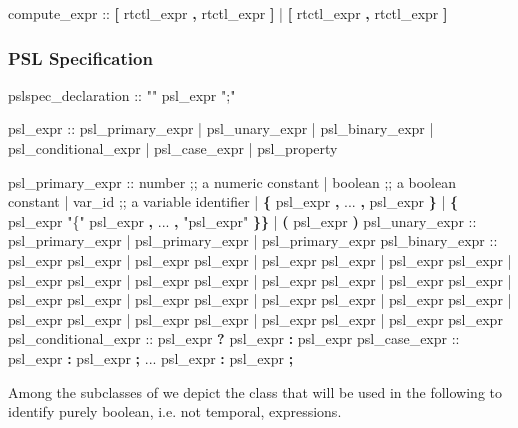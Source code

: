 \begin{Grammar}
compute_expr ::  \textbf{[} rtctl_expr \textbf{,} rtctl_expr \textbf{]}
              |  \textbf{[} rtctl_expr \textbf{,} rtctl_expr \textbf{]}
\end{Grammar}


\subsubsection{PSL Specification}
%
\begin{Grammar}
pslspec_declaration :: "" psl_expr ";"
\end{Grammar}
%
\begin{Grammar}
psl_expr ::
   psl_primary_expr
 | psl_unary_expr
 | psl_binary_expr
 | psl_conditional_expr
 | psl_case_expr
 | psl_property
\end{Grammar}
%
\begin{Grammar}
psl_primary_expr ::
   number                              ;; a numeric constant
 | boolean                             ;; a boolean constant
 | var_id                              ;; a variable identifier
 | \textbf{\{} psl_expr \textbf{,} ... \textbf{,} psl_expr \textbf{\}}
 | \textbf{\{} psl_expr "\{" psl_expr \textbf{,} ... \textbf{,} "psl_expr" \textbf{\}}\textbf{\}}
 | \textbf{(} psl_expr \textbf{)}
psl_unary_expr ::
   \operator{+} psl_primary_expr     
 | \operator{-} psl_primary_expr  
 | \operator{!} psl_primary_expr  
psl_binary_expr ::
   psl_expr \operator{+} psl_expr    
 | psl_expr  psl_expr 
 | psl_expr  psl_expr 
 | psl_expr \operator{-} psl_expr   
 | psl_expr \operator{*}psl_expr   
 | psl_expr \operator{/} psl_expr   
 | psl_expr \operator{\%} psl_expr 
 | psl_expr \operator{==} psl_expr    
 | psl_expr \operator{!=} psl_expr  
 | psl_expr \operator{<} psl_expr       
 | psl_expr \operator{<=} psl_expr       
 | psl_expr \operator{>} psl_expr       
 | psl_expr \operator{>=} psl_expr       
 | psl_expr \operator{&} psl_expr 
 | psl_expr \operator{|} psl_expr 
 | psl_expr  psl_expr 
psl_conditional_expr ::
 psl_expr \textbf{?} psl_expr \textbf{:} psl_expr 
psl_case_expr ::
     psl_expr \textbf{:} psl_expr \textbf{;}
     ...
     psl_expr \textbf{:} psl_expr \textbf{;}
\end{Grammar}
%
Among the subclasses of  we depict the class
 that will be used in the following to identify purely
boolean, i.e. not temporal, expressions.
